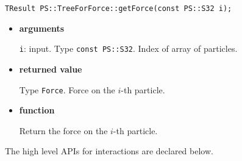 
\begin{screen}
\begin{verbatim}
TResult PS::TreeForForce::getForce(const PS::S32 i);
\end{verbatim}
\end{screen}

\begin{itemize}

\item {\bf arguments}

{\tt i}: input. Type {\tt const PS::S32}. Index of array of particles.

\item {\bf returned value}

Type {\tt Force}. Force on the $i$-th particle.

\item {\bf function}

Return the force on the $i$-th particle.

\end{itemize}


\label{sec:treeForForceHighLevelAPI}

The high level APIs for interactions are declared below.

